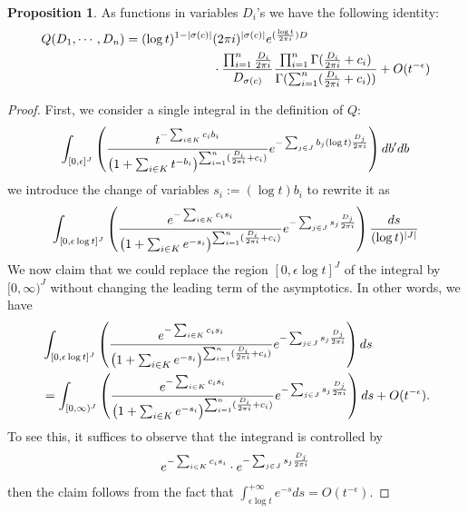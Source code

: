 \documentclass[11pt,reqno]{amsart}
\theoremstyle{definition}
\newtheorem{proposition}[theorem]{Proposition}
\numberwithin{equation}{section}
\begin{document}
\begin{proposition}\label{equality of functions}
	As functions in variables $D_i$'s we have the following identity:
	\begin{align*}
		Q(D_1,\cdots,D_n)=(\log t)^{1-|\sigma(c)|}&(2\pi {\rm i})^{|\sigma(c)|}e^{(\frac{\log t}{2\pi {\rm i}}) D}\\
		&\cdot\frac{\prod_{i=1}^n \frac{D_i}{2\pi{\rm i}}}{D_{\sigma(c)}}\frac{\prod_{i=1}^n\Gamma(\frac{D_i}{2\pi{\rm i}}+c_i)}{\Gamma(\sum_{i=1}^n(\frac{D_i}{2\pi{\rm i}}+c_i))}+O(t^{-\epsilon})
	\end{align*}
\end{proposition}
\begin{proof}

First, we consider a single integral in the definition of $Q$:
\begin{align*}
	\int_{[0,\epsilon]^J}\left(\frac{t^{-\sum_{i\in K}c_ib_i}}{\left(1+\sum_{i\in K}t^{-b_i}\right)^{\sum_{i=1}^n(\frac{D_i}{2\pi{\rm i}}+c_i)}}e^{-\sum_{j\in J}b_j (\log t)\frac{D_j}{2\pi{\rm i}}}\right)db^{\prime}db
\end{align*}
we introduce the change of variables $s_i:=(\log t)b_i$ to rewrite it as
\begin{align*}
	\int_{[0,\epsilon\log t]^J}\left(\frac{e^{-\sum_{i\in K}c_is_i}}{\left(1+\sum_{i\in K}e^{-s_i}\right)^{\sum_{i=1}^n(\frac{D_i}{2\pi{\rm i}}+c_i)}}e^{-\sum_{j\in J}s_j \frac{D_j}{2\pi{\rm i}}}\right)\frac{ds}{(\log t)^{|J|}}
\end{align*}
We now claim that we could replace the region $[0,\epsilon\log t]^J$ of the integral by $[0,\infty)^J$ without changing the leading term of the asymptotics. In other words, we have
	\begin{align*}
	&\int_{[0,\epsilon\log t]^J}\left(\frac{e^{-\sum_{i\in K}c_is_i}}{\left(1+\sum_{i\in K}e^{-s_i}\right)^{\sum_{i=1}^n(\frac{D_i}{2\pi{\rm i}}+c_i)}}e^{-\sum_{j\in J}s_j \frac{D_j}{2\pi{\rm i}}}\right)ds \\
	&=\int_{[0,\infty)^J}\left(\frac{e^{-\sum_{i\in K}c_is_i}}{\left(1+\sum_{i\in K}e^{-s_i}\right)^{\sum_{i=1}^n(\frac{D_i}{2\pi{\rm i}}+c_i)}}e^{-\sum_{j\in J}s_j \frac{D_j}{2\pi{\rm i}}}\right)ds + O(t^{-\epsilon}).
\end{align*}
	To see this, it suffices to observe that the integrand is controlled by 
	\begin{align*}
		e^{-\sum_{i\in K}c_is_i}\cdot e^{-\sum_{j\in J}s_j \frac{D_j}{2\pi{\rm i}}} 
	\end{align*}
	then the claim follows from the fact that $\int_{\epsilon\log t}^{+\infty}e^{-s}ds = O(t^{-\epsilon})$.
	

\end{proof}
\end{document}
